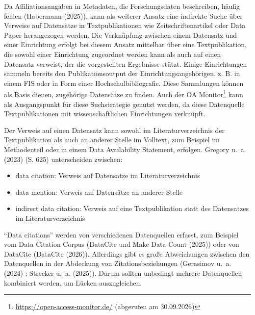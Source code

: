 \documentclass[
  ngerman,
  letterpaper,
  DIV=11]{scrreprt}
\providecommand{\tightlist}{%
  \setlength{\itemsep}{0pt}\setlength{\parskip}{0pt}}
\begin{document}
Da Affiliationsangaben in Metadaten, die Forschungsdaten beschreiben,
häufig fehlen (Habermann (2025)), kann als weiterer Ansatz eine
indirekte Suche über Verweise auf Datensätze in Textpublikationen wie
Zeitschriftenartikel oder Data Paper herangezogen werden. Die
Verknüpfung zwischen einem Datensatz und einer Einrichtung erfolgt bei
diesem Ansatz mittelbar über eine Textpublikation, die sowohl einer
Einrichtung zugeordnet werden kann als auch auf einen Datensatz
verweist, der die vorgestellten Ergebnisse stützt. Einige Einrichtungen
sammeln bereits den Publikationsoutput der Einrichtungsangehörigen, z.
B. in einem FIS oder in Form einer Hochschulbibliografie. Diese
Sammlungen können als Basis dienen, zugehörige Datensätze zu finden.
Auch der OA Monitor\footnote{\url{https://open-access-monitor.de/}
  (abgerufen am 30.09.2026)} kann als Ausgangspunkt für diese
Suchstrategie genutzt werden, da diese Datenquelle Textpublikationen mit
wissenschaftlichen Einrichtungen verknüpft.

Der Verweis auf einen Datensatz kann sowohl im Literaturverzeichnis der
Textpublikation als auch an anderer Stelle im Volltext, zum Beispiel im
Methodenteil oder in einem Data Availability Statement, erfolgen.
Gregory u.~a. (2023) (S. 625) unterscheiden zwischen:

\begin{itemize}
\tightlist
\item
  data citation: Verweis auf Datensätze im Literaturverzeichnis
\item
  data mention: Verweis auf Datensätze an anderer Stelle
\item
  indirect data citation: Verweis auf eine Textpublikation statt des
  Datensatzes im Literaturverzeichnis
\end{itemize}

``Data citations'' werden von verschiedenen Datenquellen erfasst, zum
Beispiel vom Data Citation Corpus (DataCite und Make Data Count (2025))
oder von DataCite (DataCite (2026)). Allerdings gibt es große
Abweichungen zwischen den Datenquellen in der Abdeckung von
Zitationsbeziehungen (Gerasimov u.~a. (2024) ; Strecker u.~a. (2025)).
Darum sollten unbedingt mehrere Datenquellen kombiniert werden, um
Lücken auszugleichen.
\end{document}
